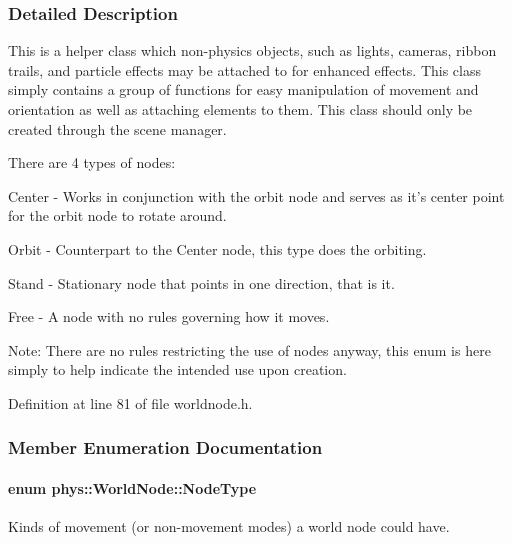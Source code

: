 \subsubsection{Detailed Description}
This is a helper class which non-\/physics objects, such as lights, cameras, ribbon trails, and particle effects may be attached to for enhanced effects. This class simply contains a group of functions for easy manipulation of movement and orientation as well as attaching elements to them. This class should only be created through the scene manager. \par
 There are 4 types of nodes: \par
 Center -\/ Works in conjunction with the orbit node and serves as it's center point for the orbit node to rotate around. \par
 Orbit -\/ Counterpart to the Center node, this type does the orbiting. \par
 Stand -\/ Stationary node that points in one direction, that is it. \par
 Free -\/ A node with no rules governing how it moves. \par
 Note: There are no rules restricting the use of nodes anyway, this enum is here simply to help indicate the intended use upon creation. 

Definition at line 81 of file worldnode.h.



\subsubsection{Member Enumeration Documentation}
\hypertarget{classphys_1_1WorldNode_a0b178b06aa411b00c4c2ccd926d9bf5a}{
\paragraph[{NodeType}]{\setlength{\rightskip}{0pt plus 5cm}enum {\bf phys::WorldNode::NodeType}}\hfill}
\label{classphys_1_1WorldNode_a0b178b06aa411b00c4c2ccd926d9bf5a}


Kinds of movement (or non-\/movement modes) a world node could have. 

